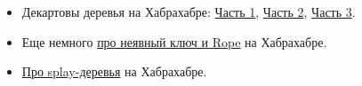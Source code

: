 \begin{itemize}
  
  \item Декартовы деревья на Хабрахабре: 
\href{http://habrahabr.ru/post/101818/}{Часть 1}, 
\href{http://habrahabr.ru/post/102006/}{Часть 2},
\href{http://habrahabr.ru/post/102364/}{Часть 3}.

  \item Еще немного \href{http://habrahabr.ru/post/112394/}{про неявный ключ и 
  Rope} на Хабрахабре.
  
  \item \href{http://habrahabr.ru/post/210296/}{Про splay-деревья} на 
  Хабрахабре.

\end{itemize}


\clearpage
